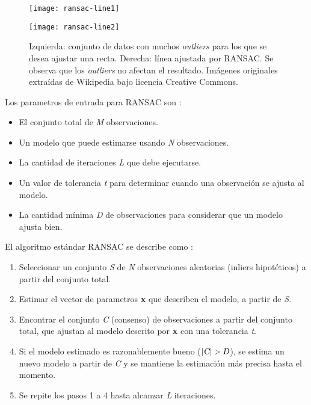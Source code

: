 \begin{figure}[ht]
\centering
\begin{minipage}[h]{.45\textwidth}
\begin{center}
\texttt{[image: ransac-line1]}
\end{center}
\end{minipage}
\hfill
\begin{minipage}[h]{.45\textwidth}
\begin{center}
\texttt{[image: ransac-line2]}
\end{center}
\end{minipage}
\hfill
\caption[RANSAC para estimar una recta 2D]
{Izquierda: conjunto de datos con muchos \textit{\textsl{outliers}} para los que se desea ajustar una recta. Derecha: línea ajustada por RANSAC. Se observa que los \textit{\textsl{outliers}} no afectan el resultado. Imágenes originales extraídas de Wikipedia bajo licencia Creative Commons.}
\label{fig:ransac-line2d}
\end{figure}

Los parametros de entrada para RANSAC son : 
\begin{itemize}

\item El conjunto total de \textsl{M} observaciones.
\item Un modelo que puede estimarse usando \textsl{N} observaciones.
\item La cantidad de iteraciones \textsl{L} que debe ejecutarse.
\item Un valor de tolerancia \textsl{t} para determinar cuando una observación se ajusta al modelo.
\item La cantidad mínima \textsl{D} de observaciones para considerar que un modelo ajusta bien.

\end{itemize}

El algoritmo estándar RANSAC se describe como :
\begin{enumerate}

\item Seleccionar un conjunto \textsl{S} de \textsl{N} observaciones aleatorias (inliers hipotéticos) a partir del conjunto total.

\item Estimar el vector de parametros \textbf{x} que describen el modelo, a partir de \textsl{S}.

\item Encontrar el conjunto \textsl{C} (consenso) de observaciones a partir del conjunto total, que ajustan al modelo descrito por \textbf{x} con una tolerancia \textsl{t}. 

\item Si el modelo estimado es razonablemente bueno ($\lvert\textsl{C}\rvert > \textsl{D} $), se estima un nuevo modelo a partir de \textsl{C} y se mantiene la estimación más precisa hasta el momento.

\item Se repite los pasos 1 a 4 hasta alcanzar \textsl{L} iteraciones.
\end{enumerate}

